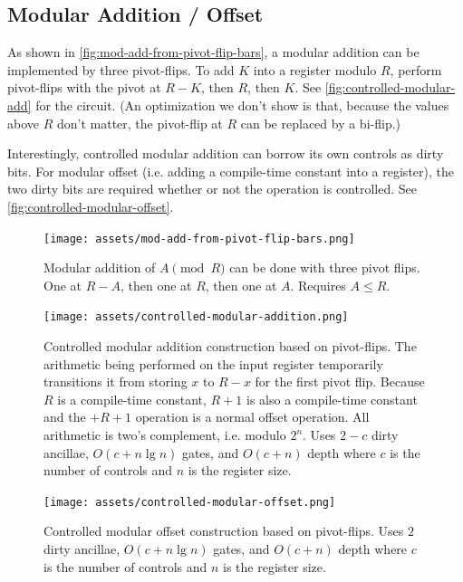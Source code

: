 \documentclass[twocolumn,longbibliography]{quantumarticle-customized}
\begin{document}
\subsection{Modular Addition / Offset}

As shown in \autoref{fig:mod-add-from-pivot-flip-bars}, a modular addition can be implemented by three pivot-flips.
To add $K$ into a register modulo $R$, perform pivot-flips with the pivot at $R-K$, then $R$, then $K$.
See \autoref{fig:controlled-modular-add} for the circuit.
(An optimization we don't show is that, because the values above $R$ don't matter, the pivot-flip at $R$ can be replaced by a bi-flip.)

Interestingly, controlled modular addition can borrow its own controls as dirty bits.
For modular offset (i.e. adding a compile-time constant into a register), the two dirty bits are required whether or not the operation is controlled.
See \autoref{fig:controlled-modular-offset}.

\begin{figure}
  \centering
  \texttt{[image: assets/mod-add-from-pivot-flip-bars.png]}
  \caption{
     Modular addition of $A \pmod{R}$ can be done with three pivot flips.
     One at $R-A$, then one at $R$, then one at $A$.
     Requires $A \leq R$.
   }
  \label{fig:mod-add-from-pivot-flip-bars}
\end{figure}

\begin{figure}
  \centering
  \texttt{[image: assets/controlled-modular-addition.png]}
  \caption{
    Controlled modular addition construction based on pivot-flips.
    The arithmetic being performed on the input register temporarily transitions it from storing $x$ to $R-x$ for the first pivot flip.
    Because $R$ is a compile-time constant, $R+1$ is also a compile-time constant and the $+R+1$ operation is a normal offset operation.
    All arithmetic is two's complement, i.e. modulo $2^n$.
    Uses $2-c$ dirty ancillae, $O(c + n \lg n)$ gates, and $O(c + n)$ depth where $c$ is the number of controls and $n$ is the register size.
  }
  \label{fig:controlled-modular-add}
\end{figure}

\begin{figure}
  \centering
  \texttt{[image: assets/controlled-modular-offset.png]}
  \caption{
    Controlled modular offset construction based on pivot-flips.
    Uses $2$ dirty ancillae, $O(c + n \lg n)$ gates, and $O(c + n)$ depth where $c$ is the number of controls and $n$ is the register size.
  }
  \label{fig:controlled-modular-offset}
\end{figure}
\end{document}
